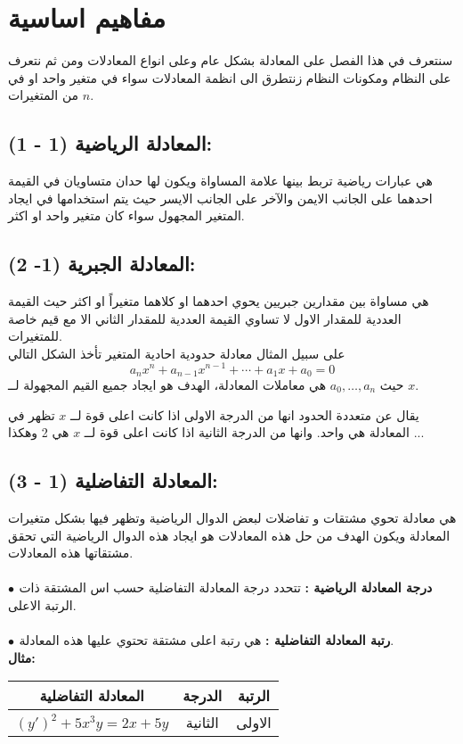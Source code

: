 \chapter{مفاهيم اساسية}

سنتعرف في هذا الفصل على المعادلة بشكل عام وعلى انواع المعادلات ومن ثم نتعرف على النظام ومكونات النظام زنتطرق الى انظمة المعادلات سواء في متغير واحد او في $n$ من المتغيرات.

\section*{المعادلة الرياضية (1 - 1):}
هي عبارات رياضية تربط بينها علامة المساواة ويكون لها حدان متساويان في القيمة احدهما على الجانب الايمن والآخر على الجانب الايسر حيث يتم استخدامها في ايجاد المتغير المجهول سواء كان متغير واحد او اكثر.

\section*{المعادلة الجبرية (1- 2):}
هي مساواة بين مقدارين جبريين يحوي احدهما او كلاهما متغيراً او اكثر حيث القيمة العددية للمقدار الاول لا تساوي القيمة العددية للمقدار الثاني الا مع قيم خاصة للمتغيرات.\\
على سبيل المثال معادلة حدودية احادية المتغير تأخذ الشكل التالي
\[
a_n x^n + a_{n-1}x^{n-1} + \cdots + a_1 x + a_0 = 0
\]
حيث $a_0, \dots, a_n$ هي معاملات المعادلة، الهدف هو ايجاد جميع القيم المجهولة لــ $x$.

\begin{note}
	يقال عن متعددة الحدود انها من الدرجة الاولى اذا كانت اعلى قوة لــ $x$ تظهر في المعادلة هي واحد. وانها من الدرجة الثانية اذا كانت اعلى قوة لــ $x$ هي 2 وهكذا ...
\end{note}

\section*{المعادلة التفاضلية (1 - 3):}
هي معادلة تحوي مشتقات و تفاضلات لبعض الدوال الرياضية وتظهر فيها بشكل متغيرات المعادلة ويكون الهدف من حل هذه المعادلات هو ايجاد هذه الدوال الرياضية التي تحقق مشتقاتها هذه المعادلات.\\
\\
\textbf{$\bullet$ درجة المعادلة الرياضية :}
تتحدد درجة المعادلة التفاضلية حسب اس المشتقة ذات الرتبة الاعلى.\\ \\
\textbf{$\bullet$ رتبة المعادلة التفاضلية :}
هي رتبة اعلى مشتقة تحتوي عليها هذه المعادلة.\\
\noindent
\textbf{مثال:}
	\begin{table}[H]
		\renewcommand{\arraystretch}{1.4}
		\centering
		\begin{tabular}{|c|c|c|}
			\hline
			\textbf{المعادلة التفاضلية} & \textbf{الدرجة} & \textbf{الرتبة}\\
			\hline
			$(y')^2 + 5x^3 y = 2x + 5y$ & الثانية & الاولى\\
			\hline
		\end{tabular}
	\end{table}

